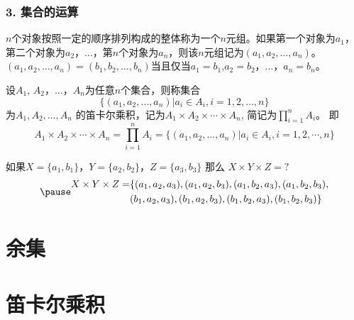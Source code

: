 \documentclass{beamer}
\begin{document}
\begin{CJK*}{UTF8}{gbsn}
\begin{frame}
  \frametitle{3. 集合的运算}
  \begin{Def}
    $n$个对象按照一定的顺序排列构成的整体称为一个\alert{$n$元组}。如果第一个对象为$a_1$，第二个对象为$a_2$，$\ldots$，第$n$个对象为$a_n$，则该$n$元组记为$(a_1,a_2, \ldots, a_n)$。
$(a_1,a_2, \ldots, a_n)=(b_1,b_2, \ldots, b_n)$当且仅当$a_1=b_1$,$a_2=b_2$，$\ldots$，$a_n=b_n$。
  \end{Def}\pause
  \begin{Def}
    设$A_1$, $A_2$，$\ldots$，$A_n$为任意$n$个集合，则称集合 \[\{(a_1,a_2, \ldots, a_n)|a_i\in A_i, i = 1,2,\ldots, n\}\] 为$A_1, A_2, \ldots, A_n$ 的\alert{笛卡尔乘积}，记为$A_1 \times A_2 \times \cdots \times A_n$, 简记为$\prod_{i=1}^nA_i$。
即\small{\vspace{-0.4cm}
\begin{equation*}
  A_1 \times A_2 \times \cdots \times A_n = \prod_{i=1}^nA_i = \{(a_1,a_2, \ldots, a_n)|a_i \in A_i, i = 1, 2, \cdots, n\}
\end{equation*}}
  \end{Def}\pause
\vspace{-0.6cm}
  \begin{Ex}
    如果$X=\{a_1,b_1\}$，$Y=\{a_2,b_2\}$，$Z=\{a_3,b_3\}$ 那么 $X \times Y \times Z = ?$
\small{
    \begin{equation*}
\pause
      \begin{split}
       X \times Y \times Z =& \{ (a_1,a_2, a_3), (a_1,a_2, b_3), (a_1, b_2, a_3), (a_1,b_2, b_3), \\
&(b_1, a_2, a_3), (b_1, a_2, b_3), (b_1, b_2, a_3), (b_1, b_2, b_3) \}\\
      \end{split}
    \end{equation*}}
  \end{Ex}
\end{frame}

\section{余集}
\section{笛卡尔乘积}

\end{CJK*}
\end{document}
